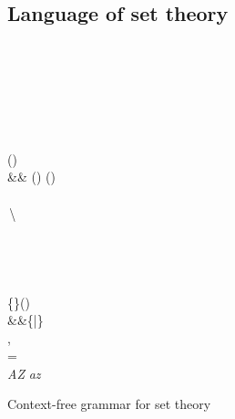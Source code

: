 \documentclass[letterpaper]{article}
\begin{document}
\subsection{Language of set theory}
\begin{Grammar}
\begin{bnf*}
		{}\\
		{\bnfor{}\longleftrightarrow{}}\\
		{\bnfor{}\longleftarrow{}}\\
		{ \bnfor {} \longrightarrow {}}\\
		{ \bnfor {} \lor {}}\\		
		{ \bnfor {} \land {}}\\
	\label{fprod}
		{
		\bnfor \lnot{}
		\bnfor ()}\\
	&&{	\bnfor (\exists{})
		\bnfor (\forall{})
		\bnfor \top \bnfor \bot
		}\\
	\bnfprod{set}
		{\bnfpn{s5}}\\
	\bnfprod{s5}
		{\bnfor{}\,\backslash\,}\\
		{\bnfor{}\,\triangle\,}\\
		{\bnfor{}\,\cup\,}\\
		{\bnfor{}\,\cap\,}\\
		{\bnfor{}\times{}\\}
		{\bnfor\bigcup{}\bnfor\{\}\bnfor()}\\
	&&{\bnfor\{\in{}|\}}\\
		{\bnfor{},}\\
		{\in \bnfor \notin \bnfor \ni \bnfor \not\ni
			\bnfor \subset \bnfor \not\subset
			\bnfor \supset \bnfor \not\supset
			\bnfor = \bnfor \neq
			\bnfor \subsetneqq \bnfor \supsetneqq}\\
	\label{varprod}
		{\textit{A}\bnfsk\textit{Z}
		\bnfor \textit{a}\bnfsk\textit{z}
		\bnfor \alpha \bnfsk \omega
		\bnfor \bnfsk}
\end{bnf*}
\caption{Context-free grammar for set theory}\label{settheorygrammar}
\end{Grammar}
\end{document}
